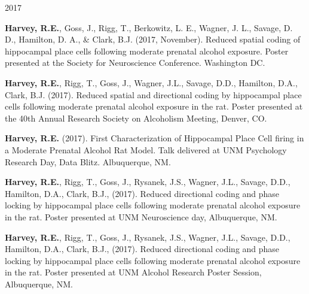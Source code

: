 \begin{cventries}
\cventry
    {} %
    {} %
    {} %
    {2017} %
    {
      \begin{cvitems} %
      \setlength\itemsep{0.35em}
        \item {\textbf{Harvey, R.E.}, Goss, J., Rigg, T., Berkowitz, L. E., Wagner, J. L., Savage, D. D., Hamilton, D. A., \& Clark, B.J. (2017, November). Reduced spatial coding of hippocampal place cells following moderate prenatal alcohol exposure. Poster presented at the Society for Neuroscience Conference. Washington DC.}
        \item {\textbf{Harvey, R.E.}, Rigg, T., Goss, J., Wagner, J.L., Savage, D.D., Hamilton, D.A., Clark, B.J. (2017). Reduced spatial and directional coding by hippocampal place cells following moderate prenatal alcohol exposure in the rat. Poster presented at the 40th Annual Research Society on Alcoholism Meeting, Denver, CO.}
        \item {\textbf{Harvey, R.E.} (2017). First Characterization of Hippocampal Place Cell firing in a Moderate Prenatal Alcohol Rat Model. Talk delivered at UNM Psychology Research Day, Data Blitz. Albuquerque, NM.}
        \item {\textbf{Harvey, R.E.}, Rigg, T., Goss, J., Rysanek, J.S., Wagner, J.L., Savage, D.D., Hamilton, D.A., Clark, B.J., (2017). Reduced directional coding and phase locking by hippocampal place cells following moderate prenatal alcohol exposure in the rat. Poster presented at UNM Neuroscience day, Albuquerque, NM.}
        \item {\textbf{Harvey, R.E.}, Rigg, T., Goss, J., Rysanek, J.S., Wagner, J.L., Savage, D.D., Hamilton, D.A., Clark, B.J., (2017). Reduced directional coding and phase locking by hippocampal place cells following moderate prenatal alcohol exposure in the rat. Poster presented at UNM Alcohol Research Poster Session, Albuquerque, NM.}      
      \end{cvitems}
    }
\end{cventries}

